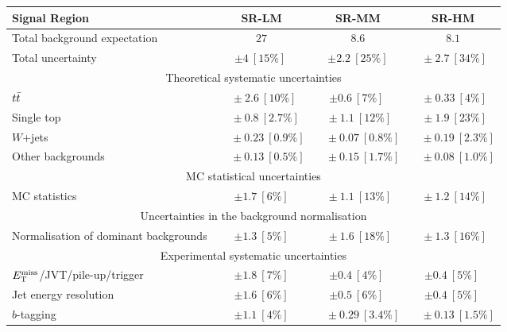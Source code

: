 \begin{table}
\begin{center}
\setlength{\tabcolsep}{0.0pc}
\begin{tabular*}{\textwidth}{lccc}
\toprule
\textbf{Signal Region}                                    & SR-LM            & SR-MM            & SR-HM            \\
\midrule
Total background expectation             &  $27$        &  $8.6$        &  $8.1$       \\
\midrule
Total uncertainty               & $\pm 4\ [15\%]~$        & $\pm 2.2\ [25\%] $        & $~\pm 2.7\ [34\%] $             \\
\midrule
\multicolumn{4}{c}{Theoretical systematic uncertainties}\\
\midrule
$t\bar{t}$          & $~~\pm 2.6\ [10\%] $          & $\pm 0.6\ [7\%]~ $          & $~\pm 0.33\ [4\%] $       \\
Single top          & $~~~\pm 0.8\ [2.7\%] $          & $~\pm 1.1\ [12\%] $          & $~\pm 1.9\ [23\%] $       \\
$W$+jets         & $~~~~~\pm 0.23\ [0.9\%] $          & $~~~~\pm 0.07\ [0.8\%] $          & $~~~~\pm 0.19\ [2.3\%] $       \\
Other backgrounds      & $~~~~~\pm 0.13\ [0.5\%] $          & $~~~~\pm 0.15\ [1.7\%] $          & $~~~~\pm 0.08\ [1.0\%] $       \\
\midrule
\multicolumn{4}{c}{MC statistical uncertainties}\\
\midrule
MC statistics         & $\pm 1.7\ [6\%] $          & $~\pm 1.1\ [13\%] $          & $~\pm 1.2\ [14\%] $       \\
\midrule
\multicolumn{4}{c}{Uncertainties in the background normalisation}\\
\midrule
Normalisation of dominant backgrounds         & $\pm 1.3\ [5\%] $          & $~\pm 1.6\ [18\%] $          & $~\pm 1.3\ [16\%] $       \\
\midrule
\multicolumn{4}{c}{Experimental systematic uncertainties}\\
\midrule
$E_{\textrm{T}}^{\textrm{miss}}$/JVT/pile-up/trigger         & $\pm 1.8\ [7\%] $          & $\pm 0.4\ [4\%]~ $          & $\pm 0.4\ [5\%]~ $       \\
Jet energy resolution         & $\pm 1.6\ [6\%] $          & $\pm 0.5\ [6\%]~ $          & $\pm 0.4\ [5\%]~ $       \\
$b$-tagging         & $\pm 1.1\ [4\%] $          & $~~~~\pm 0.29\ [3.4\%] $          & $~~~~\pm 0.13\ [1.5\%] $       \\

\end{tabular*}
\end{center}
\end{table}
